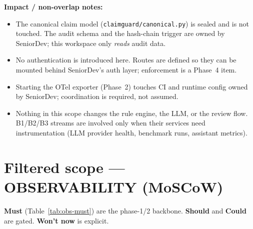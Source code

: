 \documentclass[11pt]{article}
\newcommand{\code}[1]{\texttt{#1}}
\begin{document}
\textbf{Impact / non-overlap notes:}

\begin{itemize}
\item The canonical claim model (\code{claimguard/canonical.py}) is sealed and
      is not touched. The audit schema and the hash-chain trigger are owned by
      SeniorDev; this workspace only \emph{reads} audit data.
\item No authentication is introduced here. Routes are defined so they can be
      mounted behind SeniorDev's auth layer; enforcement is a Phase~4 item.
\item Starting the OTel exporter (Phase~2) touches CI and runtime config owned
      by SeniorDev; coordination is required, not assumed.
\item Nothing in this scope changes the rule engine, the LLM, or the review
      flow. B1/B2/B3 streams are involved only when their services need
      instrumentation (LLM provider health, benchmark runs, assistant metrics).
\end{itemize}

\section{Filtered scope --- OBSERVABILITY (MoSCoW)}

\textbf{Must} (Table~\ref{tab:obs-must}) are the phase-1/2 backbone.
\textbf{Should} and \textbf{Could} are gated. \textbf{Won't now} is explicit.
\end{document}
